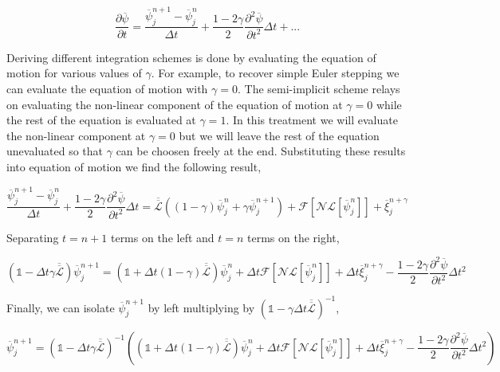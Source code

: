 \documentclass[11pt]{article}
\newcommand{\f}{\frac}
\newcommand*{\tn}[1]{\overline{\overline{#1}}}
\renewcommand*{\vec}[1]{\overline{#1}}
\begin{document}
\begin{equation}
	\f{\partial \vec{\psi}}{\partial t} = \f{\vec{\psi}_j^{n+1} - \vec{\psi}_j^n}{\Delta t} + \f{1 - 2 \gamma}{2}\f{\partial^2 \vec{\psi}}{\partial t^2} \Delta t + ...
\end{equation}

Deriving different integration schemes is done by evaluating the equation of motion for various values of $\gamma$. For example, to recover simple Euler stepping we can evaluate the equation of motion with $\gamma = 0$. The semi-implicit scheme relays on evaluating the non-linear component of the equation of motion at $\gamma = 0$ while the rest of the equation is evaluated at $\gamma = 1$. In this treatment we will evaluate the non-linear component at $\gamma = 0$ but we will leave the rest of the equation unevaluated so that $\gamma$ can be choosen freely at the end. Substituting these results into equation of motion we find the following result, 

\begin{equation}
	\f{\vec{\psi}_j^{n + 1} - \vec{\psi}_j^{n}}{\Delta t}  + \f{1 - 2\gamma}{2} \f{\partial^2 \vec{\psi}}{\partial t^2}\Delta t = \tn{\mathcal{L}} \left( (1 - \gamma) \vec{\psi}_j^n  + \gamma \vec{\psi}_j^{n+1} \right) + \mathcal{F}\left[\mathcal{NL}\left[ \vec{\psi}_j^{n}\right]\right] + \vec{\xi}_j^{n + \gamma}
\end{equation}

Separating $t=n+1$ terms on the left and $t=n$ terms on the right, 

\begin{equation}
	\left(\mathbb{1} - \Delta t  \gamma \tn{\mathcal{L}}\right) \vec{\psi}_j^{n + 1} 
		= \left(\mathbb{1} + \Delta t (1 - \gamma) \tn{\mathcal{L}}\right) \vec{\psi}_j^n 
		+ \Delta t \mathcal{F}\left[\mathcal{NL}\left[\vec{\psi}_j^n\right]\right] 
		+ \Delta t \vec{\xi}_j^{n + \gamma} 
		- \f{1 - 2\gamma}{2}\f{\partial^2 \vec{\psi}}{\partial t^2}\Delta t^2
\end{equation} 

Finally, we can isolate $\vec{\psi}_j^{n +1}$ by left multiplying by $\left(\mathbb{1} - \gamma \Delta t \tn{\mathcal{L}}\right)^{-1}$, 

\begin{equation}
	\vec{\psi}_j^{n + 1} 
		=  \left(\mathbb{1} - \Delta t  \gamma \tn{\mathcal{L}}\right)^{-1} \left(
			\left(\mathbb{1} + \Delta t (1 - \gamma) \tn{\mathcal{L}}\right) \vec{\psi}_j^n 
			+ \Delta t \mathcal{F}\left[\mathcal{NL}\left[\vec{\psi}_j^n\right]\right] 
			+ \Delta t \vec{\xi}_j^{n + \gamma} 
			- \f{1 - 2\gamma}{2}\f{\partial^2 \vec{\psi}}{\partial t^2}\Delta t^2 
		\right)
\end{equation}
\end{document}
